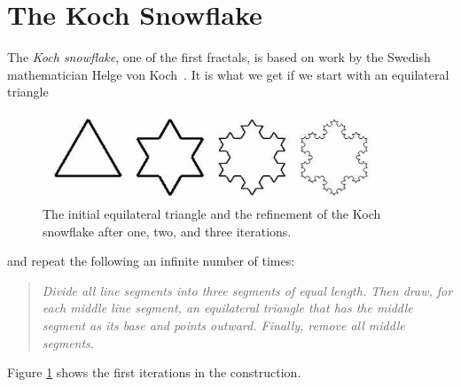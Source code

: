 \documentclass[12pt,a4paper]{article}
\begin{document}
	
	\section{The Koch Snowflake}
		The \emph{Koch snowflake}, one of the first fractals, is based on work by the Swedish mathematician Helge von Koch~\cite{koch}.
		It is what we get if we start with an equilateral triangle\begin{figure}[h] \label{koch}
			  \centering
			  \includegraphics[width=10cm]{snowflake.jpg}
			  \caption{The initial equilateral triangle and the refinement of the Koch snowflake after
				     one, two, and three iterations.}
			\end{figure}		
			and repeat the following an infinite number of times:
			\begin{quote}
				 \textit{Divide all line segments into three segments of equal length. Then draw, for
				          	   each middle line segment, an equilateral triangle that has the middle segment
					   as its base and points outward. Finally, remove all middle segments.}
			\end{quote}
		Figure \ref{koch} shows the first iterations in the construction.
\end{document}
